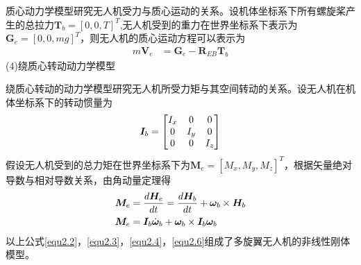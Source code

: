 质心动力学模型研究无人机受力与质心运动的关系。设机体坐标系下所有螺旋桨产生的总拉力$\boldsymbol{T}_b=[0,0,T]^{T}$,无人机受到的重力在世界坐标系下表示为$\boldsymbol{G}_e=[0,0,mg]^T$，则无人机的质心运动方程可以表示为
\begin{equation}
\label{equ2.4}
\begin{aligned}
m\boldsymbol{V}_e &= \boldsymbol{G}_e -  \boldsymbol{R}_{EB} \boldsymbol{T}_b
\end{aligned}
\end{equation}
(4)绕质心转动动力学模型

绕质心转动的动力学模型研究无人机所受力矩与其空间转动的关系。设无人机在机体坐标系下的转动惯量为
\begin{equation}
\label{equ2.5}
\boldsymbol{I}_b = 
\begin{bmatrix}
I_x & 0 & 0 \cr
0 & I_y & 0 \cr
0 & 0 & I_z \cr
\end{bmatrix}
\end{equation}
假设无人机受到的总力矩在世界坐标系下为$\boldsymbol{M}_e=[M_x,M_y,M_z]^T$，根据矢量绝对导数与相对导数关系，由角动量定理得
\begin{equation}
\label{equ2.6}
\begin{aligned}
\boldsymbol{M}_e &= {d\boldsymbol{H}_e \over dt} = {d\boldsymbol{H}_b \over dt} +  \boldsymbol{\omega}_b \times \boldsymbol{H}_b 
\\
\boldsymbol{M}_e &= \boldsymbol{I}_b \dot{\boldsymbol{\omega}}_b +\boldsymbol{\omega}_b \times \boldsymbol{I}_b \boldsymbol{\omega}_b 
\end{aligned}
\end{equation}
以上公式\eqref{equ2.2}，\eqref{equ2.3}，\eqref{equ2.4}，\eqref{equ2.6}组成了多旋翼无人机的非线性刚体模型。

